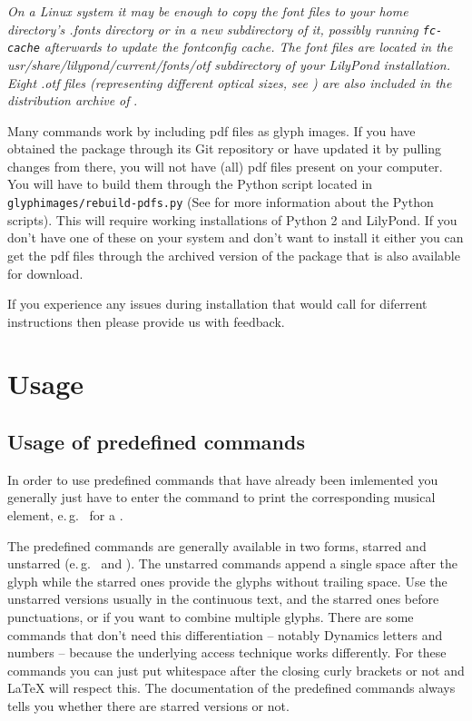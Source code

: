 \documentclass{article}
\begin{document}
\textit{On a Linux system it may be enough to copy the \emmentaler font files to your home directory's .fonts directory or in a new subdirectory of it, possibly running \texttt{fc-cache} afterwards to update the fontconfig cache. 
The font files are located in the usr/share/lilypond/current/fonts/otf subdirectory of your LilyPond installation. 
Eight .otf files (representing different optical sizes, see ) are also included in the distribution archive of \lilyglyphs}.

Many commands work by including pdf files as glyph images. 
If you have obtained the package through its Git repository or have updated it by pulling changes from there, you will not have (all) pdf files present on your computer.
You will have to build them through the Python script located in \texttt{glyphimages/rebuild-pdfs.py} (See  for more information about the Python scripts).
This will require working installations of Python 2 and LilyPond.
If you don't have one of these on your system and don't want to install it either you can get the pdf files through the archived version of the package that is also available for download.

If you experience any issues during installation that would call for diferrent instructions then please provide us with feedback.

\section{Usage}
\label{sec:usage}

\subsection{Usage of predefined commands}
\label{subsec:usage_predefined_commands}
In order to use predefined commands that have already been imlemented you generally just have to enter the command to print the corresponding musical element, e.\,g.\  for a \lilyTimeC*.

The predefined commands are generally available in two forms, starred and unstarred (e.\,g.\  and ). 
The unstarred commands append a single space after the glyph while the starred ones provide the glyphs without trailing space. 
Use the unstarred versions usually in the continuous text, and the starred ones before punctuations, or if you want to combine multiple glyphs.
There are some commands that don't need this differentiation -- notably Dynamics letters and numbers -- because the underlying access technique works differently.
For these commands you can just put whitespace after the closing curly brackets or not and \LaTeX{} will respect this.
The documentation of the predefined commands always tells you whether there are starred versions or not.
\end{document}
